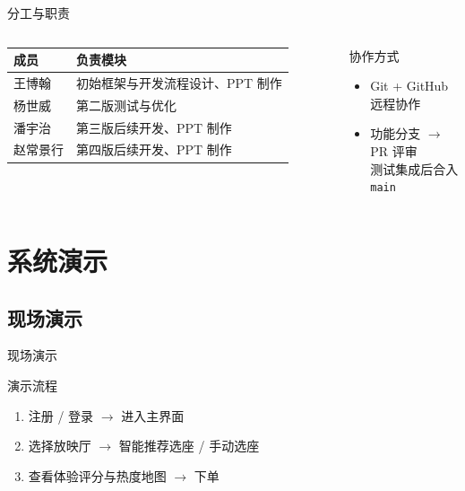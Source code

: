 \documentclass{beamer}
\begin{document}
\begin{frame}{分工与职责}
  \begin{columns}[T,onlytextwidth]
      \begin{table}
        \footnotesize
        \centering
        \begin{tabular}{p{}p{}}
          \toprule
          成员 & 负责模块 \\
          \midrule
          王博翰 & 初始框架与开发流程设计、PPT 制作 \\
          杨世威 & 第二版测试与优化 \\
          潘宇治 & 第三版后续开发、PPT 制作 \\
          赵常景行 & 第四版后续开发、PPT 制作 \\
          \bottomrule
        \end{tabular}
      \end{table}
      \begin{block}{协作方式}
        \small
        \begin{itemize}
          \setlength{\itemsep}{7pt}
          \item Git + GitHub 远程协作
          \item 功能分支 $\rightarrow$ PR 评审\\测试集成后合入 \texttt{main}
        \end{itemize}
      \end{block}
  \end{columns}
\end{frame}

\section{系统演示}

\subsection{现场演示}

\begin{frame}{现场演示}
  \begin{block}{演示流程}
    \begin{enumerate}
      \setlength{\itemsep}{4pt}
      \item 注册 / 登录 $\rightarrow$ 进入主界面
      \item 选择放映厅 $\rightarrow$ 智能推荐选座 / 手动选座
      \item 查看体验评分与热度地图 $\rightarrow$ 下单
    \end{enumerate}
  \end{block}
\end{frame}
\end{document}
